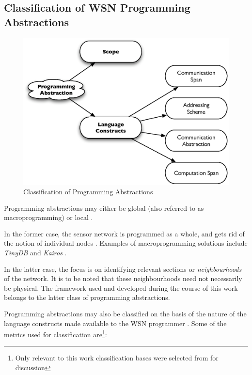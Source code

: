 \subsection{Classification of WSN Programming Abstractions}

\begin{figure}
\centering
\label{Fig:ProgrAbstrClassification}
\includegraphics[scale=0.6]{img/ProgAbstr_Classification.eps}
\caption{Classification of Programming Abstractions} 
\end{figure} 


Programming abstractions may either be global (also referred to 
as macroprogramming) or local \cite{hadim_middleware:2006}. 

In the former case, the sensor network is programmed as a whole, and gets rid of
the notion of individual nodes \cite{mottola_middleware:2008}. Examples of
macroprogramming solutions include \emph{TinyDB} \cite{madden_TinyDB:2005} and
\emph{Kairos} \cite{gummadi_Kairos:2005}. 

In the latter case, the focus is on identifying relevant sections or
\emph{neighbourhoods} of the network. It is to be noted that these neighbourhoods
need not necessarily be physical. The framework used and developed during the
course of this work belongs to the latter class of programming abstractions.

Programming abstractions may also be classified on the basis of the
nature of the language constructs made available to the WSN programmer
\cite{mottola_middleware:2008}. Some of the metrics used for classification
are\footnote{Only relevant to this work classification bases
were selected from \cite{mottola_middleware:2008} for discussion}:

